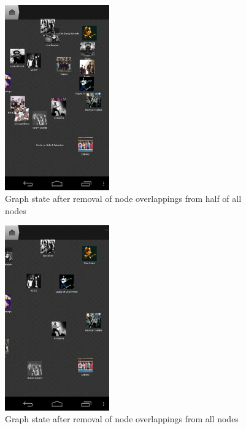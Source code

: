 \begin{figure}[H]
  \centering
    \includegraphics[width=0.4\textwidth]{figures/screen_mds_9_after_half_uncollided_nodes}
  \caption{Graph state after removal of node overlappings from half of all nodes}
\end{figure}

\begin{figure}[H]
  \centering
    \includegraphics[width=0.4\textwidth]{figures/screen_mds_10_after_all_uncollided_nodes}
  \caption{Graph state after removal of node overlappings from all nodes}
\end{figure}

